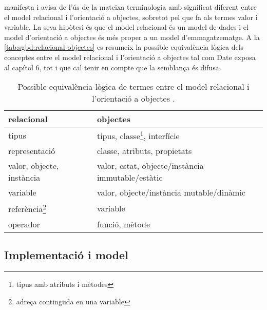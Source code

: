 \textcite[cap.~6]{date06} manifesta i avisa de l'ús de la mateixa
terminologia amb significat diferent entre el model relacional i
l'orientació a objectes, sobretot pel que fa als termes valor i
variable. %
La seva hipòtesi és que el model relacional és un model de dades i el
model d'orientació a objectes és més proper a un model
d'emmagatzematge. %
A la \autoref{tab:sgbd:relacional-objectes} es resumeix la possible equivalència lògica dels
conceptes entre el model relacional i l'orientació a objectes tal com
Date exposa al capítol 6, tot i que cal tenir en compte que
la semblança és difusa.


\begin{table}
\centering
\begin{tabular}[ht]{ll}
  relacional & objectes \\\hline \hline
  tipus & tipus, classe\footnote{tipus amb atributs i mètodes}, interfície \\\hline
  representació & classe, atributs, propietats \\\hline
  valor, objecte, instància & valor, estat, objecte/instància immutable/estàtic \\\hline
  variable & valor, objecte/instància mutable/dinàmic \\\hline
  referència\footnote{adreça continguda en una variable} & variable \\\hline
  operador & funció, mètode \\\hline
\end{tabular}
\caption{Possible equivalència lògica de termes entre el model relacional i l'orientació a objectes \parencite[cap.~6]{date06}.}
\label{tab:sgbd:relacional-objectes}
\end{table}




\subsection{Implementació i model}

